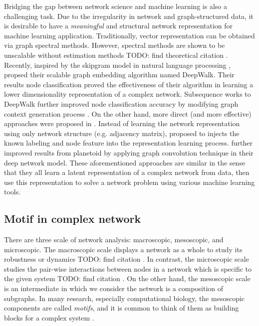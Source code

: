 \documentclass{article}
\theoremstyle{definition}
\begin{document}
Bridging the gap between network science and machine learning
is also a challenging task. Due to the irregularity in network and 
graph-structured data, it is desirable to have a \emph{meaningful}
and structural network representation for machine learning application. 
Traditionally, vector representation can be obtained via graph spectral methods.
However, spectral methods are shown to be unscalable without estimation
methods TODO: find theoretical citation \cite{deepwalk,node2vec}.
Recently, inspired by the skipgram model in natural language processing
\cite{skipgram}, \citeauthor{deepwalk} propsed their scalable graph
embedding algorithm named DeepWalk. Their results node classification
proved the effectiveness of their algorithm in learning a lower dimensionality 
representation of a complex network. Subsequence works to DeepWalk
further improved node classification accuracy by modifying graph 
context generation process \cite{line,grarep,node2vec}. On the other
hand, more direct (and more effective) approaches were proposed in
\cite{planetoid,gcn}. Instead of learning the network representation
using only network structure (e.g. adjacency matrix), \citeauthor{planetoid}
proposed to injects the known labeling and node feature into the
representation learning process. \citeauthor{gcn} further improved
results from planetoid \cite{planetoid} by applying graph convolution
technique in their deep network model. These aforementioned approaches 
are similar in the sense that they all learn a latent representation 
of a complex network from data, then use this representation to solve 
a network problem using various machine learning tools. 

\subsection{Motif in complex network}

There are three scale of network analysis: macroscopic, mesoscopic, 
and microscopic. The macroscopic scale displays a network as a whole to
study its robustness \cite{callaway2000network} or dynamics TODO: find citation \cite{barabasi2014network}.
In contrast, the microscopic scale studies the pair-wise interactions
between nodes in a network which is specific to the given system
TODO: find citation \cite{physicnet}. On the other hand, the mesoscopic
scale is an intermediate in which we consider the network is a composition of
subgraphs. In many research, especially computational biology, the
mesoscopic components are called \emph{motifs}, and it is common
to think of them as building blocks for a complex system \cite{motifblockmilo}.
\end{document}
